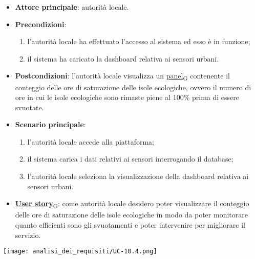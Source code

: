 \begin{itemize}
	\item \textbf{Attore principale}: autorità locale.
	\item \textbf{Precondizioni}:
	      \begin{enumerate}
		      \item l'autorità locale ha effettuato l'accesso al sistema ed esso è in funzione;
		      \item il sistema ha caricato la dashboard relativa ai sensori urbani.
	      \end{enumerate}
	\item \textbf{Postcondizioni}: l'autorità locale visualizza un \href{https://7last.github.io/docs/rtb/documentazione-interna/glossario\#panel}{panel\textsubscript{G}} contenente il conteggio delle ore di saturazione delle isole ecologiche,
	      ovvero il numero di ore in cui le isole ecologiche sono rimaste piene al 100\% prima di essere svuotate.
	\item \textbf{Scenario principale}:
	      \begin{enumerate}
		      \item l'autorità locale accede alla piattaforma;
		      \item il sistema carica i dati relativi ai sensori interrogando il database;
		      \item l'autorità locale seleziona la visualizzazione della dashboard relativa ai sensori urbani.
	      \end{enumerate}
	\item \href{https://7last.github.io/docs/rtb/documentazione-interna/glossario\#user-story}{\textbf{User story}\textsubscript{G}}:
	      come autorità locale desidero poter visualizzare il conteggio delle ore di saturazione delle isole ecologiche in modo da poter monitorare
	      quanto efficienti sono gli svuotamenti e poter intervenire per migliorare il servizio.
\end{itemize}
\begin{center}
	\texttt{[image: analisi\_dei\_requisiti/UC-10.4.png]}
\end{center}


